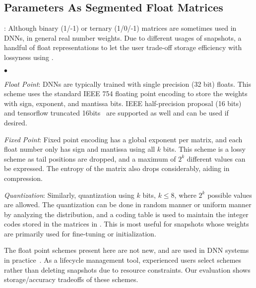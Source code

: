 \documentclass[conference]{IEEEtran}
\begin{document}
\subsection{Parameters As Segmented Float Matrices}
\label{subsec:pas_float}


: 
Although binary (1/-1) or ternary (1/0/-1) matrices are sometimes used in DNNs, in general \weightstore\handles real number weights. Due to different usages of snapshots, \weightstore\offers a handful of float representations to let the user trade-off storage efficiency with lossyness using \dlv. %
\begin{list}{$\bullet$}{\leftmargin 0.10in \topsep -2pt} %
\item \emph{Float Point}: DNNs are typically trained with single precision (32 bit) floats. This scheme uses the standard IEEE 754 floating point encoding to store the weights with sign, exponent, and mantissa bits. IEEE half-precision proposal (16 bits) and tensorflow truncated 16bits~\cite{tensorflow} are supported as well and can be used if desired.
\item \emph{Fixed Point}: Fixed point encoding has a global exponent per matrix, and each float number only has sign and mantissa using all $k$ bits. This scheme is a lossy scheme as tail positions are dropped, and a maximum of $2^k$ different values can be expressed. The entropy of the matrix also drops considerably, aiding in compression.
\item \emph{Quantization}: Similarly, \weightstore\supports quantization using $k$ bits, $k\leq8$, where $2^k$ possible values are allowed. The quantization can be done in random manner or uniform manner by analyzing the distribution, and a coding table is used to maintain the  integer codes stored in the matrices in \weightstore\eat{)}.
This is most useful for snapshots whose weights are primarily used for fine-tuning or initialization.
\end{list}


The float point schemes present here are not new, and are used in DNN systems in practice~\cite{vanhoucke2011improving,han2015deep,courbariaux2014training}. As a lifecycle management tool, \weightstore{} experienced users select schemes rather than deleting snapshots due to resource constraints. Our evaluation shows storage/accuracy tradeoffs of these schemes.
\end{document}
